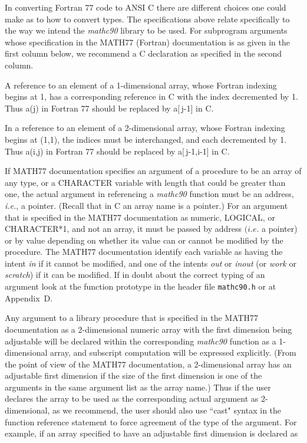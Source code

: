 \documentclass[twoside]{MATH77}
\begin{document}
In converting Fortran 77 code to ANSI C there are different choices one
could make as to how to convert types.  The specifications above relate
specifically to the way we intend the {\em mathc90} library to be used.
For subprogram arguments whose specification in the MATH77 (Fortran)
documentation is as given in the first column below, we recommend a C
declaration as specified in the second column.

A reference to an element of a 1-dimensional array, whose Fortran indexing
begins at 1, has a corresponding reference in C with the index decremented
by 1.  Thus a(j) in Fortran 77 should be replaced by a[\,j-1] in C.

In a reference to an element of a 2-dimensional array, whose Fortran
indexing begins at (1,1), the indices must be interchanged, and each
decremented by 1. Thus a(i,j) in Fortran 77 should be replaced by %
a[\,j-1,i-1] in C.

If MATH77 documentation specifies an argument of a procedure to be an
array of any type, or a CHARACTER variable with length that could be
greater than one, the actual argument in referencing a {\em mathc90}
function must be an address, {\em i.e.}, a pointer. (Recall that in C
an array name is a pointer.) For an argument that is specified in the
MATH77 documentation as numeric, LOGICAL, or CHARACTER*1, and not an
array, it must be passed by address $(i.e$. a pointer) or by value
depending on whether its value can or cannot be modified by the
procedure. The MATH77 documentation identify each variable as having the
intent {\em in} if it cannot be modified, and one of the intents {\em
out} or {\em inout} (or {\em work} or {\em scratch}) if it can be
modified. If in doubt about the correct typing of an argument look at
the function prototype in the header file {\tt mathc90.h} or at
Appendix~D.

Any argument to a library procedure that is specified in the MATH77
documentation as a 2-dimensional numeric array with the first dimension
being adjustable will be declared within the corresponding {\em mathc90}
function as a 1-dimensional array, and subscript computation will be
expressed explicitly.  (From the point of view of the MATH77
documentation, a 2-dimensional array has an adjustable first dimension if
the size of the first dimension is one of the arguments in the same
argument list as the array name.) Thus if the user declares the array to
be used as the corresponding actual argument as 2-dimensional, as we
recommend, the user should also use ``cast" syntax in the function
reference statement to force agreement of the type of the argument.  For
example, if an array specified to have an adjustable first dimension is
declared as
\end{document}
